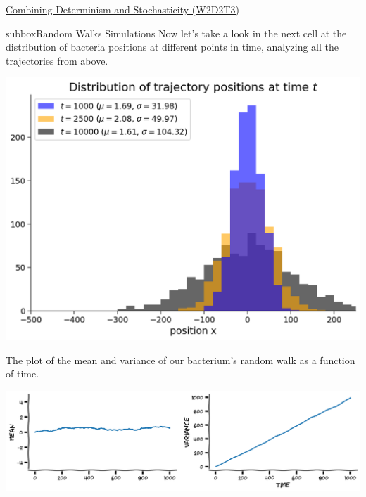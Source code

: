 \begin{textbox}{\href{https://compneuro.neuromatch.io/tutorials/W2D2_LinearSystems/student/W2D2_Tutorial3.html}{Combining Determinism and Stochasticity (W2D2T3)} }
\begin{subbox}{subbox}{Random Walks Simulations}
Now let's take a look in the next cell at the distribution of bacteria positions at different points in time, analyzing all the trajectories from above.
\begin{center}
\includegraphics[scale=0.25]{Figures/LS/CDS_Figure4.png}
\end{center}
The plot of the mean and variance of our bacterium's random walk as a function of time.

\begin{center}
\includegraphics[scale=0.25]{Figures/LS/CDS_Figure5.png}
\end{center}
\end{subbox}
\end{textbox}

